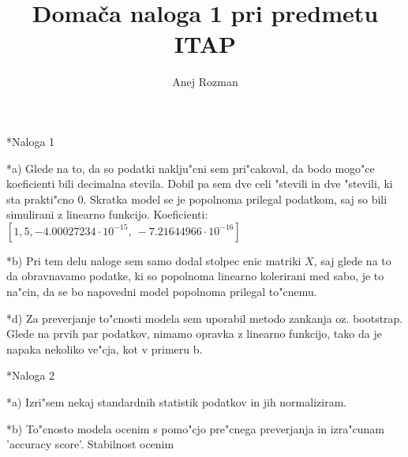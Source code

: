 \documentclass[a4paper, 10pt]{article}
\begin{document}
\title{Domača naloga 1 pri predmetu ITAP}
\author{Anej Rozman}
\date{}
\maketitle

\begin{subsection}*{Naloga 1}

    \begin{subsubsection}*{a)}
        Glede na to, da so podatki naklju"cni sem pri"cakoval, da bodo mogo"ce koeficienti bili 
        decimalna stevila. Dobil pa sem dve celi "stevili in dve "stevili, ki sta prakti"cno $0$. Skratka 
        model se je popolnoma prilegal podatkom, saj so bili simulirani z linearno funkcijo. 
        \newline
        Koeficienti: $[ 1,   5, -4.00027234\cdot 10^{-15}, \ -7.21644966\cdot10^{-16}]$
    \end{subsubsection}

    \begin{subsubsection}*{b)}
        Pri tem delu naloge sem samo dodal stolpec enic matriki $X$, saj glede na to da obravnavamo 
        podatke, ki so popolnoma linearno kolerirani med sabo, je to na"cin, da se bo napovedni model
        popolnoma prilegal to"cnemu.
    \end{subsubsection}

    \begin{subsubsection}*{d)}
        Za preverjanje to"cnosti modela sem uporabil metodo zankanja oz. bootstrap. Glede na prvih par 
        podatkov, nimamo opravka z linearno funkcijo, tako da je napaka nekoliko ve"cja, kot v primeru b.
    \end{subsubsection}

\end{subsection}

\begin{subsection}*{Naloga 2}

    \begin{subsubsection}*{a)}
        Izri"sem nekaj standardnih statistik podatkov in jih normaliziram.
    \end{subsubsection}

    \begin{subsubsection}*{b)}
        To"cnosto modela ocenim s pomo"cjo pre"cnega preverjanja in izra"cunam 'accuracy score'.
        Stabilnost ocenim 
    \end{subsubsection}


\end{subsection}
\end{document}
